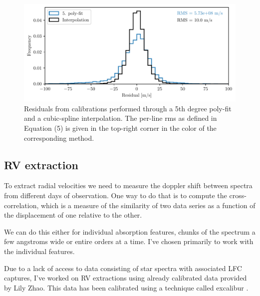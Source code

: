     \begin{figure}%
        \begin{wide}  
            \includegraphics[width=\textwidth]{figures/calib/hist_peak_residuals_poly_and_interp.pdf}
            \caption{Residuals from calibrations performed through a 5th degree poly-fit and a cubic-spline interpolation. The per-line rms as defined in Equation (5) is given in the top-right corner in the color of the corresponding method.}
            \label{fig:calib_poly_vs_interp}
        \end{wide}
    \end{figure}


\subsection{RV extraction}


    To extract radial velocities we need to measure the doppler shift between spectra from different days of observation. One way to do that is to compute the cross-correlation, which is a measure of the similarity of two data series as a function of the displacement of one relative to the other.
    
    We can do this either for individual absorption features, chunks of the spectrum a few angstroms wide or entire orders at a time. I've chosen primarily to work with the individual features.

    Due to a lack of access to data consisting of star spectra with associated LFC captures, I've worked on RV extractions using already calibrated data provided by Lily Zhao. This data has been calibrated using a technique called excalibur \cite{zhao2021excalibur}.
    
